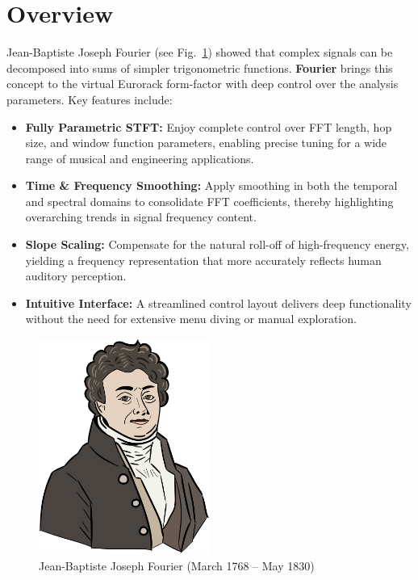 \documentclass[12pt,letter]{article}
\begin{document}


\section{Overview}


Jean-Baptiste Joseph Fourier (see Fig.~\ref{fig:fourier-portrait}) showed
that complex signals can be decomposed into sums of simpler trigonometric
functions. \textbf{Fourier} brings this concept to the virtual Eurorack
form-factor with deep control over the analysis parameters. Key features
include:
\begin{itemize}
  \item \textbf{Fully Parametric STFT:} Enjoy complete control over FFT
  length, hop size, and window function parameters, enabling precise tuning
  for a wide range of musical and engineering applications.
  \item \textbf{Time \& Frequency Smoothing:} Apply smoothing in both the
  temporal and spectral domains to consolidate FFT coefficients, thereby
  highlighting overarching trends in signal frequency content.
  \item \textbf{Slope Scaling:} Compensate for the natural roll-off of
  high-frequency energy, yielding a frequency representation that more
  accurately reflects human auditory perception.
  \item \textbf{Intuitive Interface:} A streamlined control layout delivers
  deep functionality without the need for extensive menu diving or manual
  exploration.
\end{itemize}

\begin{figure}[!htp]
\centering
\includegraphics[width=0.5\textwidth]{img/FourierPortrait}
\caption{Jean-Baptiste Joseph Fourier (March 1768 -- May 1830)}
\label{fig:fourier-portrait}
\end{figure}
\end{document}

